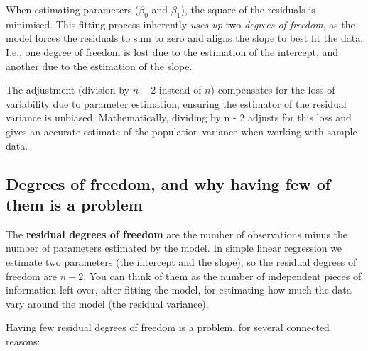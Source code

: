 \documentclass[
  letterpaper,
  8pt,
  a4paper]{book}
\begin{document}
When estimating parameters (\(\beta_0\) and \(\beta_1\)), the square of
the residuals is minimised. This fitting process inherently \emph{uses
up} two \emph{degrees of freedom}, as the model forces the residuals to
sum to zero and aligns the slope to best fit the data. I.e., one degree
of freedom is lost due to the estimation of the intercept, and another
due to the estimation of the slope.

The adjustment (division by \(n-2\) instead of \(n\)) compensates for
the loss of variability due to parameter estimation, ensuring the
estimator of the residual variance is unbiased. Mathematically, dividing
by n - 2 adjusts for this loss and gives an accurate estimate of the
population variance when working with sample data.

\subsection*{Degrees of freedom, and why having few of them is a
problem}\label{degrees-of-freedom-and-why-having-few-of-them-is-a-problem}

The \textbf{residual degrees of freedom} are the number of observations
minus the number of parameters estimated by the model. In simple linear
regression we estimate two parameters (the intercept and the slope), so
the residual degrees of freedom are \(n - 2\). You can think of them as
the number of independent pieces of information left over, after fitting
the model, for estimating how much the data vary around the model (the
residual variance).

Having few residual degrees of freedom is a problem, for several
connected reasons:
\end{document}
